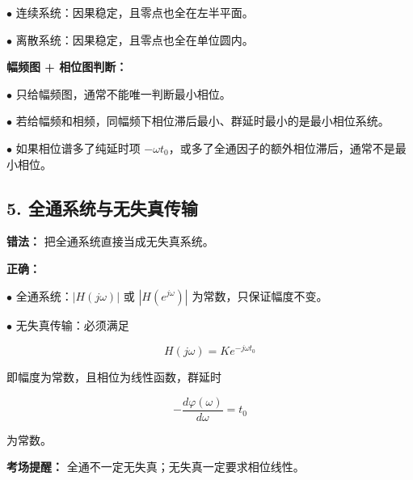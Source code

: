 \documentclass[11pt]{ctexart}
\begin{document}
\noindent\(\bullet\) 连续系统：因果稳定，且零点也全在左半平面。\par

\noindent\(\bullet\) 离散系统：因果稳定，且零点也全在单位圆内。\par



\textbf{幅频图 + 相位图判断：}\par



\noindent\(\bullet\) 只给幅频图，通常不能唯一判断最小相位。\par

\noindent\(\bullet\) 若给幅频和相频，同幅频下相位滞后最小、群延时最小的是最小相位系统。\par

\noindent\(\bullet\) 如果相位谱多了纯延时项 \(-\omega t_0\)，或多了全通因子的额外相位滞后，通常不是最小相位。\par



\subsection*{5. 全通系统与无失真传输}



\textbf{错法：} 把全通系统直接当成无失真系统。\par



\textbf{正确：}\par



\noindent\(\bullet\) 全通系统：\(|H(j\omega)|\) 或 \(|H(e^{j\omega})|\) 为常数，只保证幅度不变。\par

\noindent\(\bullet\) 无失真传输：必须满足\par

\[

  H(j\omega)=Ke^{-j\omega t_0}

  \]

即幅度为常数，且相位为线性函数，群延时\par

\[

  -\frac{d\varphi(\omega)}{d\omega}=t_0

  \]

为常数。\par



\textbf{考场提醒：} 全通不一定无失真；无失真一定要求相位线性。\par
\end{document}
